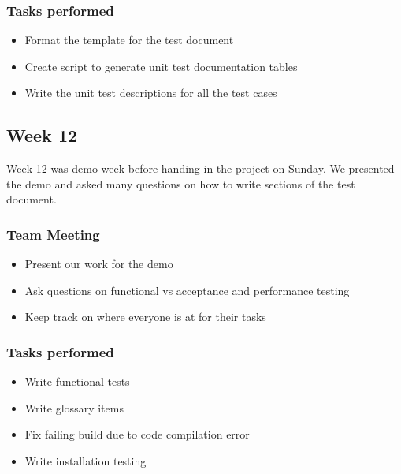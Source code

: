 \documentclass[12pt]{article}
\begin{document}
\subsubsection{Tasks performed}
\begin{itemize}
    \item Format the template for the test document
    \item Create script to generate unit test documentation tables
    \item Write the unit test descriptions for all the test cases
\end{itemize}

\subsection{Week 12}
Week 12 was demo week before handing in the project on Sunday.
We presented the demo and asked many questions on how to write sections of the test document.

\subsubsection{Team Meeting}
\begin{itemize}
    \item Present our work for the demo
    \item Ask questions on functional vs acceptance and performance testing
    \item Keep track on where everyone is at for their tasks
\end{itemize}

\subsubsection{Tasks performed}
\begin{itemize}
    \item Write functional tests
    \item Write glossary items
    \item Fix failing build due to code compilation error
    \item Write installation testing
\end{itemize}
\end{document}
